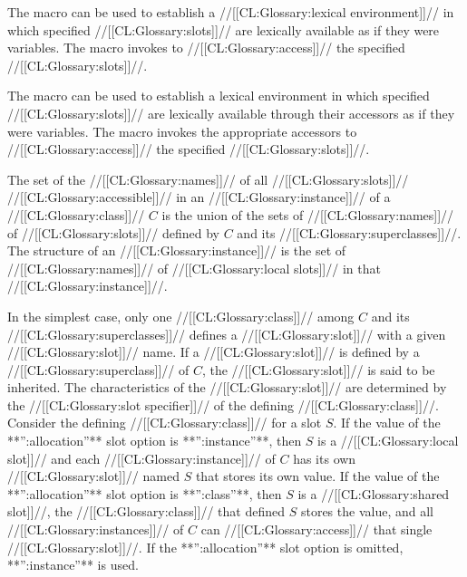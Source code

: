 The macro  can be used to establish a 
//[[CL:Glossary:lexical environment]]// in which specified //[[CL:Glossary:slots]]// are lexically
available as if they were variables.  The macro  
invokes  to //[[CL:Glossary:access]]// the specified //[[CL:Glossary:slots]]//.

The macro  can be used to establish a lexical
environment in which specified //[[CL:Glossary:slots]]// are lexically available through
their accessors as if they were variables.  The macro 
invokes the appropriate accessors to //[[CL:Glossary:access]]// the specified //[[CL:Glossary:slots]]//. 




\endsubSection%

The set of the //[[CL:Glossary:names]]// of all //[[CL:Glossary:slots]]// //[[CL:Glossary:accessible]]// 
in an //[[CL:Glossary:instance]]// of a //[[CL:Glossary:class]]// $C$ is the union of 
the sets of //[[CL:Glossary:names]]// of //[[CL:Glossary:slots]]// defined by $C$ and its
//[[CL:Glossary:superclasses]]//. The structure of an //[[CL:Glossary:instance]]// is
the set of //[[CL:Glossary:names]]// of //[[CL:Glossary:local slots]]// in that //[[CL:Glossary:instance]]//.

In the simplest case, only one //[[CL:Glossary:class]]// among $C$ and its //[[CL:Glossary:superclasses]]//
defines a //[[CL:Glossary:slot]]// with a given //[[CL:Glossary:slot]]// name.  
If a //[[CL:Glossary:slot]]// is defined by a //[[CL:Glossary:superclass]]// of $C$\negthinspace, 
the //[[CL:Glossary:slot]]// is said to be inherited.  The characteristics 
of the //[[CL:Glossary:slot]]// are determined by the //[[CL:Glossary:slot specifier]]//
of the defining //[[CL:Glossary:class]]//.
Consider the defining //[[CL:Glossary:class]]// for
a slot $S$\negthinspace.  If the value of the **'':allocation''** 
slot
option is **'':instance''**, then $S$ is a //[[CL:Glossary:local slot]]// and each 
//[[CL:Glossary:instance]]//
of $C$ has its own //[[CL:Glossary:slot]]// named $S$ that stores its own value.  If the
value of the **'':allocation''** slot 
option is **'':class''**, then $S$
is a //[[CL:Glossary:shared slot]]//, the //[[CL:Glossary:class]]// 
that defined $S$ stores the value, and all
//[[CL:Glossary:instances]]// of $C$ can //[[CL:Glossary:access]]// that single //[[CL:Glossary:slot]]//.  
If the **'':allocation''** slot option is omitted, **'':instance''** is used.

